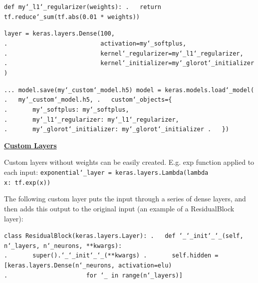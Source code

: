 \texttt{def my\char`_l1\char`_regularizer(weights):\newline
.~~~return tf.reduce\char`_sum(tf.abs(0.01 * weights))}

\texttt{layer = keras.layers.Dense(100,\newline
.~~~~~~~~~~~~~~~~~~~~~~~~~~activation=my\char`_softplus,\newline
.~~~~~~~~~~~~~~~~~~~~~~~~~~kernel\char`_regularizer=my\char`_l1\char`_regularizer,\newline
.~~~~~~~~~~~~~~~~~~~~~~~~~~kernel\char`_initializer=my\char`_glorot\char`_initializer)}

\texttt{...\newline
model.save(\textquotesingle my\char`_custom\char`_model.h5\textquotesingle)\newline
model = keras.models.load\char`_model(\newline
.~~~\textquotesingle my\char`_custom\char`_model.h5\textquotesingle,\newline
.~~~custom\char`_objects=\{\newline
.~~~~~~~\textquotesingle my\char`_softplus\textquotesingle:~my\char`_softplus,\newline
.~~~~~~~\textquotesingle my\char`_l1\char`_regularizer\textquotesingle:~my\char`_l1\char`_regularizer,\newline
.~~~~~~~\textquotesingle my\char`_glorot\char`_initializer\textquotesingle:~my\char`_glorot\char`_initializer\newline
.~~~\})\newline
}\newline

\textbf{\underline{Custom Layers}}


Custom layers without weights can be easily created.
E.g. exp function applied to each input:\newline
\texttt{exponential\char`_layer = keras.layers.Lambda(lambda x:~tf.exp(x))}\newline

The following custom layer puts the input through a series of dense layers,
and then adds this output to the original input (an example of a ResidualBlock layer):

\texttt{class ResidualBlock(keras.layers.Layer):\newline
.~~~def \char`_\char`_init\char`_\char`_(self, n\char`_layers, n\char`_neurons, **kwargs):\newline
.~~~~~~~super().\char`_\char`_init\char`_\char`_(**kwargs)\newline
.~~~~~~~self.hidden = [keras.layers.Dense(n\char`_neurons, activation=\textquotesingle elu\textquotesingle)\newline
.~~~~~~~~~~~~~~~~~~~~~~for \char`_~in range(n\char`_layers)]}

